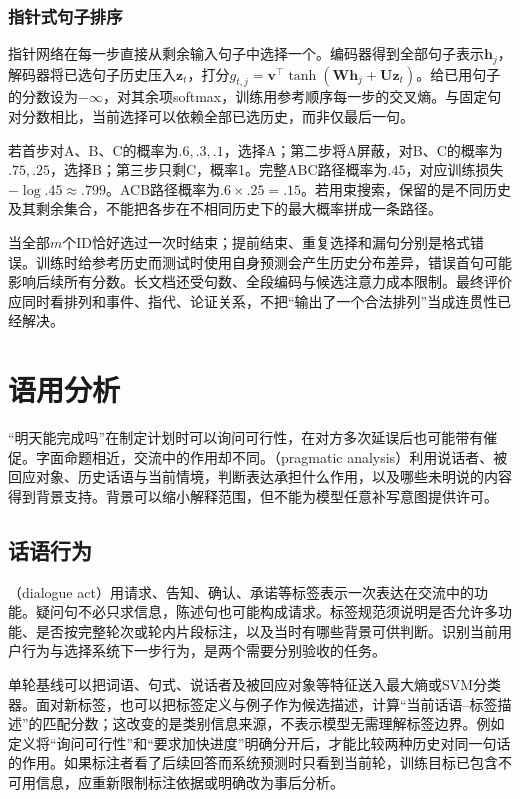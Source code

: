 \subsubsection{指针式句子排序}
\label{sec:nlp-analysis-pointer-ordering}

指针网络在每一步直接从剩余输入句子中选择一个。编码器得到全部句子表示$\bm h_j$，解码器将已选句子历史压入$\bm z_t$，打分$g_{t,j}=\bm v^\top\tanh(\bm W\bm h_j+\bm U\bm z_t)$。给已用句子的分数设为$-\infty$，对其余项softmax，训练用参考顺序每一步的交叉熵。与固定句对分数相比，当前选择可以依赖全部已选历史，而非仅最后一句。

若首步对A、B、C的概率为$.6,.3,.1$，选择A；第二步将A屏蔽，对B、C的概率为$.75,.25$，选择B；第三步只剩C，概率1。完整ABC路径概率为$.45$，对应训练损失$-\log .45\approx.799$。ACB路径概率为$.6\times.25=.15$。若用束搜索，保留的是不同历史及其剩余集合，不能把各步在不相同历史下的最大概率拼成一条路径。

当全部$m$个ID恰好选过一次时结束；提前结束、重复选择和漏句分别是格式错误。训练时给参考历史而测试时使用自身预测会产生历史分布差异，错误首句可能影响后续所有分数。长文档还受句数、全段编码与候选注意力成本限制。最终评价应同时看排列和事件、指代、论证关系，不把“输出了一个合法排列”当成连贯性已经解决。

\section{语用分析}
\label{sec:nlp-analysis-pragmatics}

“明天能完成吗”在制定计划时可以询问可行性，在对方多次延误后也可能带有催促。字面命题相近，交流中的作用却不同。（pragmatic analysis）利用说话者、被回应对象、历史话语与当前情境，判断表达承担什么作用，以及哪些未明说的内容得到背景支持。背景可以缩小解释范围，但不能为模型任意补写意图提供许可。

\subsection{话语行为}
\label{sec:nlp-analysis-dialogue-acts}

（dialogue act）用请求、告知、确认、承诺等标签表示一次表达在交流中的功能。疑问句不必只求信息，陈述句也可能构成请求。标签规范须说明是否允许多功能、是否按完整轮次或轮内片段标注，以及当时有哪些背景可供判断。识别当前用户行为与选择系统下一步行为，是两个需要分别验收的任务。

单轮基线可以把词语、句式、说话者及被回应对象等特征送入最大熵或SVM分类器。面对新标签，也可以把标签定义与例子作为候选描述，计算“当前话语--标签描述”的匹配分数；这改变的是类别信息来源，不表示模型无需理解标签边界。例如定义将“询问可行性”和“要求加快进度”明确分开后，才能比较两种历史对同一句话的作用。如果标注者看了后续回答而系统预测时只看到当前轮，训练目标已包含不可用信息，应重新限制标注依据或明确改为事后分析。

